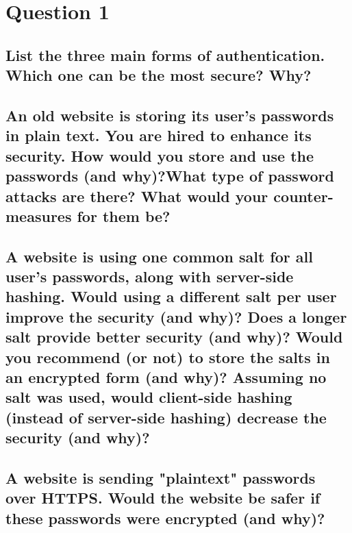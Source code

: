 \documentclass{report}
\begin{document}
	\section{Question 1}
	\startsection
		\renewcommand{\thesubsection}{\thesection.\Alph{subsection}}
		\subsection{List the three main forms of authentication. Which one can be the most secure? Why?}
		\startsubsection
		\closesection
		
		\subsection{An old website is storing its user’s passwords in plain text. You are hired to enhance its security. How would you store and use the passwords (and why)?What type of password attacks are there? What would your counter-measures for them be?}
		\startsubsection
		\closesection
		
		\subsection{A website is using one common salt for all user’s passwords, along with server-side hashing. Would using a different salt per user improve the security (and why)? Does a longer salt provide better security (and why)? Would you recommend (or not) to store the salts in an encrypted form (and why)? Assuming no salt was used, would client-side hashing (instead of server-side hashing) decrease the security (and why)?}
		\startsubsection
		\closesection
		
		\subsection{A website is sending "plaintext" passwords over HTTPS. Would the website be safer if these passwords were encrypted (and why)?}
		\startsubsection
		\closesection
	\closesection
\end{document}
